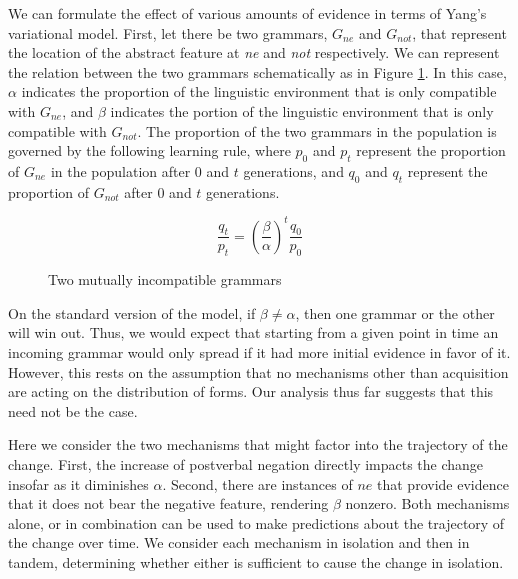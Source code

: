 \documentclass[12pt]{article}
\theoremstyle{definition} \newtheorem{definition}{Definition}
\begin{document}
We can formulate the effect of various amounts of evidence in terms of Yang's \citeyearpar{yang:2002} variational model. First, let there be two grammars, $G_{ne}$ and $G_{not}$, that represent the location of the abstract feature at \emph{ne} and \emph{not} respectively. We can represent the relation between the two grammars schematically as in Figure \ref{grammars}. In this case, $\alpha$ indicates the proportion of the linguistic environment that is only compatible with $G_{ne}$, and $\beta$ indicates the portion of the linguistic environment that is only compatible with $G_{not}$. The proportion of the two grammars in the population is governed by the following learning rule, where $p_0$ and $p_t$ represent the proportion of $G_{ne}$ in the population after $0$ and $t$ generations, and $q_0$ and $q_t$ represent the proportion of $G_{not}$ after $0$ and $t$ generations.

\begin{equation}
     \frac{q_t}{p_t} = \left( \frac{\beta}{\alpha} \right)^t\frac{q_0}{p_0}
\end{equation}

\begin{figure}
\begin{center}
\end{center}
\caption{Two mutually incompatible grammars}
\label{grammars}
\end{figure}


On the standard version of the model, if $\beta \neq \alpha$, then one grammar or the other will win out. Thus, we would expect that starting from a given point in time an incoming grammar would only spread if it had more initial evidence in favor of it. However, this rests on the assumption that no mechanisms other than acquisition are acting on the distribution of forms. Our analysis thus far suggests that this need not be the case.

Here we consider the two mechanisms that might factor into the trajectory of the change. First, the increase of postverbal negation directly impacts the change insofar as it diminishes $\alpha$. Second, there are instances of $ne$ that provide evidence that it does not bear the negative feature, rendering $\beta$ nonzero.  Both mechanisms alone, or in combination can be used to make predictions about the trajectory of the change over time. We consider each mechanism in isolation and then in tandem, determining whether either is sufficient   to cause the change in isolation.
\end{document}
